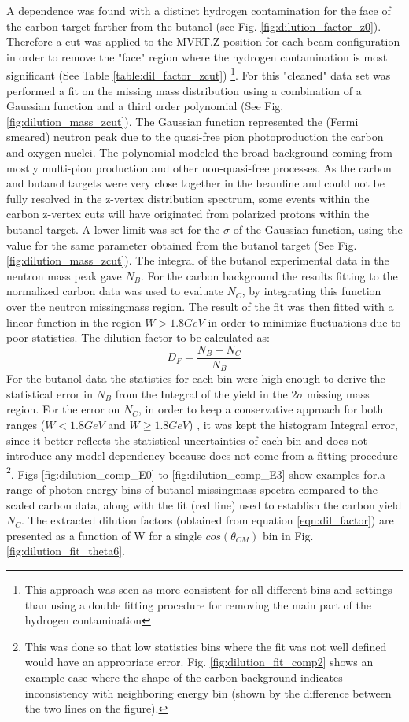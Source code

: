 A dependence was found with a distinct hydrogen contamination for the face of the carbon target farther from the butanol (see Fig. \ref{fig:dilution_factor_z0}). Therefore a cut was applied to the MVRT.Z position for each beam configuration in order to remove the "face" region where the hydrogen contamination is most significant (See Table \ref{table:dil_factor_zcut}) \footnote{This approach was seen as more consistent for all different bins and settings than using a double fitting procedure for removing the main part of the hydrogen contamination}. For this "cleaned" data set was performed a fit on the missing mass distribution using a combination of a Gaussian function and a third order polynomial (See Fig. \ref{fig:dilution_mass_zcut}). The Gaussian function represented the (Fermi smeared) neutron peak due to the quasi-free pion photoproduction the carbon and oxygen nuclei. The polynomial modeled the broad background coming from mostly multi-pion production and other non-quasi-free processes. As the carbon and butanol targets were very close together in the beamline and could not be fully resolved in the z-vertex distribution spectrum, some events within the carbon z-vertex cuts will have originated from polarized protons within the butanol target.  A lower limit was set for the $\sigma$ of the Gaussian function, using the value for the same parameter obtained from the butanol target (See Fig. \ref{fig:dilution_mass_zcut}). The integral of the butanol experimental data in the neutron mass peak gave $N_B$. For the carbon background the results fitting to the normalized carbon data was used to evaluate $N_C$, by integrating this function over the neutron missingmass region. The result of the fit was then fitted with a linear function in the region $W>1.8GeV$ in order to minimize fluctuations due to poor statistics.   The dilution factor to be calculated as:
\begin{equation} \label{eqn:dil_factor}
  D_F = \frac{N_B - N_C}{N_B}
\end{equation}
For the butanol data the statistics for each bin were high enough to derive the statistical error in $N_B$ from the Integral of the yield in the $2\sigma$ missing mass region. For the error on $N_C$, in order to keep a conservative approach for both ranges ($W<1.8GeV$ and $W\geq 1.8GeV$) , it  was kept the histogram Integral error, since it better reflects the statistical uncertainties of each bin and  does not introduce any model dependency because does not come from a fitting procedure \footnote{This was done so that low statistics bins where the fit was not well defined would have an appropriate error. Fig. \ref{fig:dilution_fit_comp2} shows an example case where the shape of the carbon background indicates inconsistency with neighboring energy bin (shown by the difference between the two lines on the figure). }. Figs \ref{fig:dilution_comp_E0} to \ref{fig:dilution_comp_E3} show examples for.a range of photon energy bins  of butanol missingmass spectra  compared to the scaled carbon data, along with the fit (red line) used to establish the carbon yield $N_C$. The extracted dilution factors (obtained from equation \ref{eqn:dil_factor}) are presented as a function of W for a single $cos(\theta_{CM})$ bin in Fig. \ref{fig:dilution_fit_theta6}.
 
